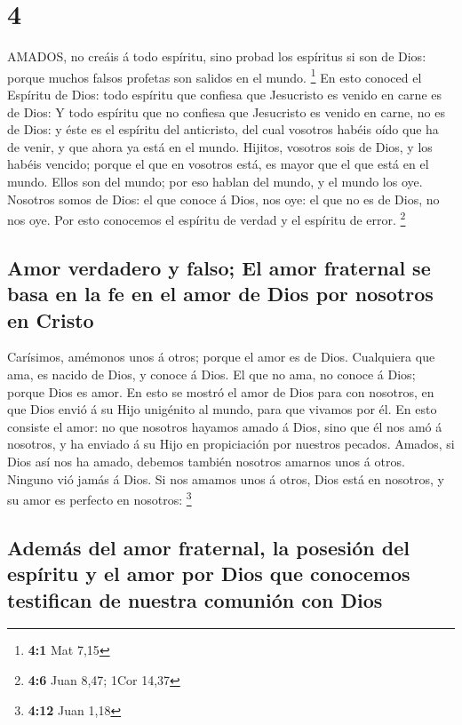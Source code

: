 \hypertarget{section-3}{%
\section{4}\label{section-3}}

 AMADOS, no creáis á todo espíritu, sino probad los
espíritus si son de Dios: porque muchos falsos profetas son salidos en
el mundo. \footnote{\textbf{4:1} Mat 7,15}  En esto conoced
el Espíritu de Dios: todo espíritu que confiesa que Jesucristo es venido
en carne es de Dios:  Y todo espíritu que no confiesa que
Jesucristo es venido en carne, no es de Dios: y éste es el espíritu del
anticristo, del cual vosotros habéis oído que ha de venir, y que ahora
ya está en el mundo.  Hijitos, vosotros sois de Dios, y los
habéis vencido; porque el que en vosotros está, es mayor que el que está
en el mundo.  Ellos son del mundo; por eso hablan del mundo,
y el mundo los oye.  Nosotros somos de Dios: el que conoce á
Dios, nos oye: el que no es de Dios, no nos oye. Por esto conocemos el
espíritu de verdad y el espíritu de error. \footnote{\textbf{4:6} Juan
  8,47; 1Cor 14,37}

\hypertarget{amor-verdadero-y-falso-el-amor-fraternal-se-basa-en-la-fe-en-el-amor-de-dios-por-nosotros-en-cristo}{%
\subsection{Amor verdadero y falso; El amor fraternal se basa en la fe
en el amor de Dios por nosotros en
Cristo}\label{amor-verdadero-y-falso-el-amor-fraternal-se-basa-en-la-fe-en-el-amor-de-dios-por-nosotros-en-cristo}}

 Carísimos, amémonos unos á otros; porque el amor es de
Dios. Cualquiera que ama, es nacido de Dios, y conoce á Dios.
 El que no ama, no conoce á Dios; porque Dios es amor.
 En esto se mostró el amor de Dios para con nosotros, en que
Dios envió á su Hijo unigénito al mundo, para que vivamos por él.
 En esto consiste el amor: no que nosotros hayamos amado á
Dios, sino que él nos amó á nosotros, y ha enviado á su Hijo en
propiciación por nuestros pecados.  Amados, si Dios así nos
ha amado, debemos también nosotros amarnos unos á otros. 
Ninguno vió jamás á Dios. Si nos amamos unos á otros, Dios está en
nosotros, y su amor es perfecto en nosotros: \footnote{\textbf{4:12}
  Juan 1,18}

\hypertarget{ademuxe1s-del-amor-fraternal-la-posesiuxf3n-del-espuxedritu-y-el-amor-por-dios-que-conocemos-testifican-de-nuestra-comuniuxf3n-con-dios}{%
\subsection{Además del amor fraternal, la posesión del espíritu y el
amor por Dios que conocemos testifican de nuestra comunión con
Dios}\label{ademuxe1s-del-amor-fraternal-la-posesiuxf3n-del-espuxedritu-y-el-amor-por-dios-que-conocemos-testifican-de-nuestra-comuniuxf3n-con-dios}}

